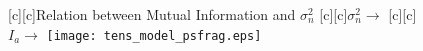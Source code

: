 \documentclass{article}
\begin{document}
\begin{figure}[htb]
  \begin{center}

        [c][c]{Relation between Mutual Information and $\sigma_n^2$}
        [c][c]{$\sigma_n^2 \rightarrow$}
        [c][c]{$I_a \rightarrow$}
    \texttt{[image: tens\_model\_psfrag.eps]}

    \end{center}
\end{figure}
\end{document}
